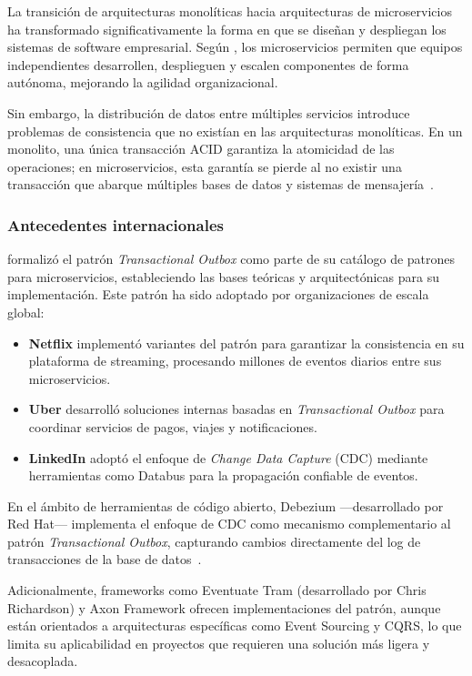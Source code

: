 La transición de arquitecturas monolíticas hacia arquitecturas de microservicios ha transformado significativamente la forma en que se diseñan y despliegan los sistemas de software empresarial. Según \textcite{fowler2014}, los microservicios permiten que equipos independientes desarrollen, desplieguen y escalen componentes de forma autónoma, mejorando la agilidad organizacional.

Sin embargo, la distribución de datos entre múltiples servicios introduce problemas de consistencia que no existían en las arquitecturas monolíticas. En un monolito, una única transacción ACID garantiza la atomicidad de las operaciones; en microservicios, esta garantía se pierde al no existir una transacción que abarque múltiples bases de datos y sistemas de mensajería~\parencite{kleppmann2017}.

\subsubsection{Antecedentes internacionales}

\textcite{richardson2018} formalizó el patrón \textit{Transactional Outbox} como parte de su catálogo de patrones para microservicios, estableciendo las bases teóricas y arquitectónicas para su implementación. Este patrón ha sido adoptado por organizaciones de escala global:

\begin{itemize}
    \item \textbf{Netflix} implementó variantes del patrón para garantizar la consistencia en su plataforma de streaming, procesando millones de eventos diarios entre sus microservicios.
    \item \textbf{Uber} desarrolló soluciones internas basadas en \textit{Transactional Outbox} para coordinar servicios de pagos, viajes y notificaciones.
    \item \textbf{LinkedIn} adoptó el enfoque de \textit{Change Data Capture} (CDC) mediante herramientas como Databus para la propagación confiable de eventos.
\end{itemize}

En el ámbito de herramientas de código abierto, Debezium ---desarrollado por Red Hat--- implementa el enfoque de CDC como mecanismo complementario al patrón \textit{Transactional Outbox}, capturando cambios directamente del log de transacciones de la base de datos~\parencite{debezium2020}.

Adicionalmente, frameworks como Eventuate Tram (desarrollado por Chris Richardson) y Axon Framework ofrecen implementaciones del patrón, aunque están orientados a arquitecturas específicas como Event Sourcing y CQRS, lo que limita su aplicabilidad en proyectos que requieren una solución más ligera y desacoplada.

